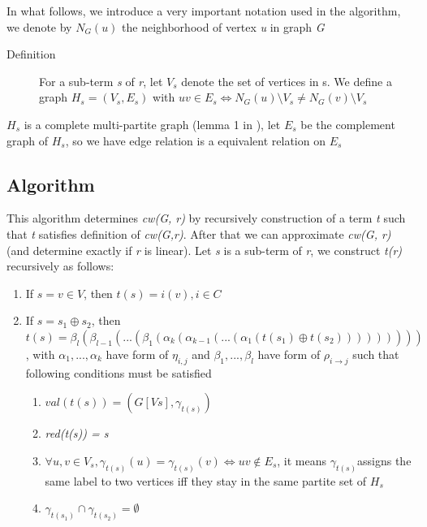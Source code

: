 \documentclass[a4paper, 12pt]{article}
\begin{document}
In what follows, we introduce a very important notation used in the algorithm, we denote by \textit {$N_{G}(u)$} the neighborhood of vertex \textit {u} in graph \textit {G} 

\begin{description}
\item [{Definition}] \cite {vadim-lozin} For a sub-term \textit {s} of \textit {r}, let \textit {$V_{s}$} denote the set of vertices in s. We define a graph \textit {$H_{s}=(V_{s}, E_{s})$} with $uv\in E_{s}\Longleftrightarrow N_{G}(u)\setminus V_{s}\neq N_{G}(v)\setminus V_{s}$
\end{description}

\textit{$H_{s}$} is a complete multi-partite graph (lemma 1 in \cite{vadim-lozin}), let \textit{$E_{s}$} be the complement graph of \textit{$H_{s}$}, so we have edge relation is a equivalent relation on \textit{$E_{s}$}

\subsection{Algorithm}

This algorithm determines \textit {cw(G, r)} by recursively construction of a term \textit {t} such that \textit {t} satisfies definition of \textit {cw(G,r)}. After that we can approximate \textit {cw(G, r)} (and determine exactly if  \textit {r} is linear). Let \textit {s} is a sub-term of \textit {r}, we construct \textit {t(r)} recursively as follows:

\begin{enumerate}
\item If $s=v\in V$, then $t(s)=i(v),i\in C$ 
\item If $s=s_{1}\oplus s_{2}$, then $t(s)=\beta_{l}(\beta_{l-1}(...(\beta_{1}(\alpha_{k}(\alpha_{k-1}(...(\alpha_{1}(t(s_{1})\oplus t(s_{2})))))))))$, with \textit {$\alpha_{1},...,\alpha_{k}$} have form of $\eta_{i,j}$ and \textit {$\beta_{1},...,\beta_{l}$} have form of $\rho_{i\rightarrow j}$ such that following conditions must be satisfied

\begin{enumerate}
\item \textit {$val(t(s))=(G[Vs],\gamma_{t(s)})$} 
\item \textit {red(t(s)) = s} 
\item $\forall u,v\in V_{s},\gamma_{t(s)}(u)=\gamma_{t(s)}(v)\Leftrightarrow uv\notin E_{s}$,
it means \textit {$\gamma_{t(s)}$}assigns the same label to two vertices iff they stay in the same partite set of \textit {$H_{s}$} 
\item \textit {$\gamma_{t(s_{1})}\cap\gamma_{t(s_{2})}=\emptyset$} \end{enumerate}
\end{enumerate}
\end{document}

